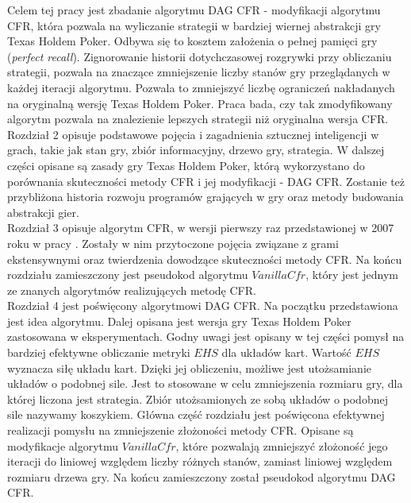 \documentclass[licencjacka]{pracamgr}
\begin{document}
\noindent
Celem tej pracy jest zbadanie algorytmu DAG CFR - modyfikacji algorytmu CFR, która pozwala na wyliczanie strategii w bardziej wiernej
abstrakcji gry Texas Holdem Poker. Odbywa się to kosztem założenia o pełnej pamięci gry (\emph{perfect recall}).
Zignorowanie historii dotychczasowej rozgrywki przy obliczaniu strategii, pozwala na znaczące zmniejszenie liczby
stanów gry przeglądanych w każdej iteracji algorytmu. Pozwala to zmniejszyć liczbę ograniczeń nakładanych
na oryginalną wersję Texas Holdem Poker. Praca bada, czy tak zmodyfikowany algorytm pozwala na znalezienie
lepszych strategii niż oryginalna wersja CFR. \\

\noindent
Rozdział 2 opisuje podstawowe pojęcia i zagadnienia sztucznej inteligencji w grach, takie jak
stan gry, zbiór informacyjny, drzewo gry, strategia. W dalszej części opisane są zasady gry
Texas Holdem Poker, którą wykorzystano do porównania skuteczności metody CFR i jej modyfikacji - DAG CFR.
Zostanie też przybliżona historia rozwoju programów grających w gry oraz metody budowania abstrakcji gier. \\

\noindent
Rozdział 3 opisuje algorytm CFR, w wersji pierwszy raz przedstawionej w 2007 roku w pracy \cite{cfr}.
Zostały w nim przytoczone pojęcia
związane z grami ekstensywnymi oraz twierdzenia dowodzące skuteczności metody CFR. Na końcu rozdziału
zamieszczony jest pseudokod algorytmu $VanillaCfr$, który jest jednym ze znanych algorytmów realizujących metodę CFR. \\

\noindent
Rozdział 4 jest poświęcony algorytmowi DAG CFR. Na początku przedstawiona jest idea algorytmu.
Dalej opisana jest wersja gry Texas Holdem Poker zastosowana w eksperymentach. Godny uwagi
jest opisany w tej części pomysł na bardziej efektywne obliczanie metryki $EHS$ dla układów kart.
Wartość $EHS$ wyznacza siłę układu kart. Dzięki jej obliczeniu, możliwe jest utożsamianie układów
o podobnej sile. Jest to stosowane w celu zmniejszenia rozmiaru gry, dla której liczona jest strategia.
Zbiór utożsamionych ze sobą układów o podobnej sile nazywamy koszykiem.
Główna część rozdziału jest poświęcona efektywnej realizacji pomysłu na zmniejszenie złożoności
metody CFR. Opisane są modyfikacje algorytmu $VanillaCfr$, które pozwalają zmniejszyć złożoność
jego iteracji do liniowej względem liczby różnych stanów, zamiast liniowej względem rozmiaru drzewa gry.
Na końcu zamieszczony został pseudokod algorytmu DAG CFR. \\
\end{document}
